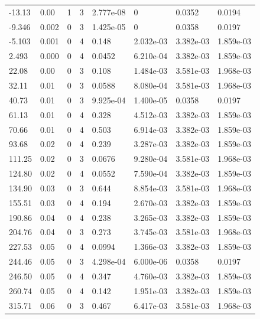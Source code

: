 \documentclass[preview]{standalone}
\begin{document}
{{\begin{tabular}{L{1.2cm}C{1.2cm} C{0.3cm}C{0.5cm} C{1.4cm}C{1.4cm} C{1.4cm}C{1.4cm}}
  -13.13  &  0.00  & 1     &  3 &  2.777e-08  & 0  & 0.0352 &  0.0194   \\ 
  -9.346  &  0.002  & 0     &  3 &  1.425e-05  & 0  & 0.0358 &  0.0197   \\ 
  -5.103  &  0.001  & 0     &  4 &  0.148  & 2.032e-03  & 3.382e-03 &  1.859e-03   \\ 
  2.493  &  0.000  & 0     &  4 &  0.0452  & 6.210e-04  & 3.382e-03 &  1.859e-03   \\ 
  22.08  &  0.00  & 0     &  3 &  0.108  & 1.484e-03  & 3.581e-03 &  1.968e-03   \\ 
  32.11  &  0.01  & 0     &  3 &  0.0588  & 8.080e-04  & 3.581e-03 &  1.968e-03   \\ 
  40.73  &  0.01  & 0     &  3 &  9.925e-04  & 1.400e-05  & 0.0358 &  0.0197   \\ 
  61.13  &  0.01  & 0     &  4 &  0.328  & 4.512e-03  & 3.382e-03 &  1.859e-03   \\ 
  70.66  &  0.01  & 0     &  4 &  0.503  & 6.914e-03  & 3.382e-03 &  1.859e-03   \\ 
  93.68  &  0.02  & 0     &  4 &  0.239  & 3.287e-03  & 3.382e-03 &  1.859e-03   \\ 
  111.25  &  0.02  & 0     &  3 &  0.0676  & 9.280e-04  & 3.581e-03 &  1.968e-03   \\ 
  124.80  &  0.02  & 0     &  4 &  0.0552  & 7.590e-04  & 3.382e-03 &  1.859e-03   \\ 
  134.90  &  0.03  & 0     &  3 &  0.644  & 8.854e-03  & 3.581e-03 &  1.968e-03   \\ 
  155.51  &  0.03  & 0     &  4 &  0.194  & 2.670e-03  & 3.382e-03 &  1.859e-03   \\ 
  190.86  &  0.04  & 0     &  4 &  0.238  & 3.265e-03  & 3.382e-03 &  1.859e-03   \\ 
  204.76  &  0.04  & 0     &  3 &  0.273  & 3.745e-03  & 3.581e-03 &  1.968e-03   \\ 
  227.53  &  0.05  & 0     &  4 &  0.0994  & 1.366e-03  & 3.382e-03 &  1.859e-03   \\ 
  244.46  &  0.05  & 0     &  3 &  4.298e-04  & 6.000e-06  & 0.0358 &  0.0197   \\ 
  246.50  &  0.05  & 0     &  4 &  0.347  & 4.760e-03  & 3.382e-03 &  1.859e-03   \\ 
  260.74  &  0.05  & 0     &  4 &  0.142  & 1.951e-03  & 3.382e-03 &  1.859e-03   \\ 
  315.71  &  0.06  & 0     &  3 &  0.467  & 6.417e-03  & 3.581e-03 &  1.968e-03   \\ 

\end{tabular}}}
\end{document}
